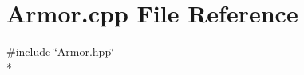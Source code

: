 \section{Armor.\-cpp File Reference}
\label{_armor_8cpp}
{\ttfamily \#include \char`\"{}Armor.\-hpp\char`\"{}}\\*
